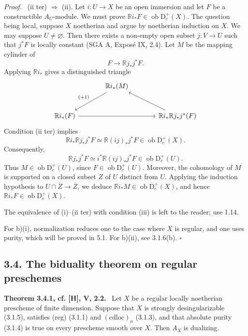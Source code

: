 \documentclass[11pt]{article}
\providecommand{\qedtext}{\hfill$\square$}
\newenvironment{statement}[1]{\par\medskip\noindent\textbf{#1.}\ }{\par\medskip}
\newenvironment{prooftext}[1][Proof]{\par\noindent\emph{#1.}\ }{\par\medskip}
\newcommand{\D}{\mathrm{D}}
\newcommand{\ob}{\operatorname{ob}}
\newcommand{\ol}[1]{\overline{#1}}
\providecommand{\ob}{\operatorname{ob}}
\providecommand{\qedtext}{\hfill$\square$}
\begin{document}
\begin{prooftext}
(ii ter) $\Rightarrow$ (ii). Let $i:U\to X$ be an open immersion and let $F$ be a constructible $A_U$-module. We must prove $\mathbb{R} i_*F\in\ob\D_c^+(X)$. The question being local, suppose $X$ noetherian and argue by noetherian induction on $X$. We may suppose $U\ne\varnothing$. Then there exists a non-empty open subset $j:V\to U$ such that $j^*F$ is locally constant (SGA A, Exposé IX, 2.4). Let $M$ be the mapping cylinder of
\[
   F\longrightarrow \mathbb{R} j_*j^*F.
\]
Applying $\mathbb{R} i_*$ gives a distinguished triangle
\[
\begin{tikzcd}[column sep=large,row sep=large]
& \mathbb{R} i_*(M) \arrow[dl,"{(+1)}"'] & \\
\mathbb{R} i_*(F) \arrow[rr] & & \mathbb{R} i_*\mathbb{R} j_*j^*(F) \arrow[ul]
\end{tikzcd}
\]
Condition (ii ter) implies
\[
   \mathbb{R} i_*\mathbb{R} j_*j^*F\simeq\mathbb{R}(ij)_*j^*F\in\ob\D_c^+(X).
\]
Consequently,
\[
   \mathbb{R} j_*j^*F\simeq i^*\mathbb{R}(ij)_*j^*F\in\ob\D_c^+(U).
\]
Thus $M\in\ob\D_c^+(U)$, since $F\in\ob\D_c^+(U)$. Moreover, the cohomology of $M$ is supported on a closed subset $Z$ of $U$ distinct from $U$. Applying the induction hypothesis to $U\cap\ol Z\to\ol Z$, we deduce $\mathbb{R} i_*M\in\ob\D_c^+(X)$, and hence $\mathbb{R} i_*F\in\ob\D_c^+(X)$.

The equivalence of (i)--(ii ter) with condition (iii) is left to the reader; use 1.14.

For b)(i), normalization reduces one to the case where $X$ is regular, and one uses purity, which will be proved in 5.1. For b)(ii), see 3.1.6(b). \qedtext
\end{prooftext}

\subsection*{3.4. The biduality theorem on regular preschemes}

\begin{statement}{Theorem 3.4.1, cf. [H], V, 2.2}
Let $X$ be a regular locally noetherian prescheme of finite dimension. Suppose that $X$ is strongly desingularizable (3.1.5), satisfies (reg) (3.1.1) and $(\mathrm{cdloc})_n$ (3.1.3), and that absolute purity (3.1.4) is true on every prescheme smooth over $X$. Then $A_X$ is dualizing.
\end{statement}
\end{document}
